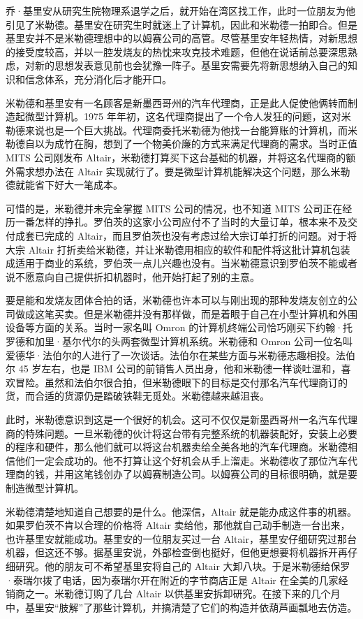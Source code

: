 \documentclass[12pt,UTF8]{ctexbook}
\begin{document}
乔·基里安从研究生院物理系退学之后，就开始在湾区找工作，此时一位朋友为他引见了米勒德。基里安在研究生时就迷上了计算机，因此和米勒德一拍即合。但是基里安并不是米勒德理想中的以姆赛公司的高管。尽管基里安年轻热情，对新思想的接受度较高，并以一腔发烧友的热忱来攻克技术难题，但他在说话前总要深思熟虑，对新的思想发表意见前也会犹豫一阵子。基里安需要先将新思想纳入自己的知识和信念体系，充分消化后才能开口。

米勒德和基里安有一名顾客是新墨西哥州的汽车代理商，正是此人促使他俩转而制造起微型计算机。1975 年年初，这名代理商提出了一个令人发狂的问题，这对米勒德来说也是一个巨大挑战。代理商委托米勒德为他找一台能算账的计算机，而米勒德自以为成竹在胸，想到了一个物美价廉的方式来满足代理商的需求。当时正值 MITS 公司刚发布 Altair，米勒德打算买下这台基础的机器，并将这名代理商的额外需求想办法在 Altair 实现就行了。要是微型计算机能解决这个问题，那么米勒德就能省下好大一笔成本。

可惜的是，米勒德并未完全掌握 MITS 公司的情况，也不知道 MITS 公司正在经历一番怎样的挣扎。罗伯茨的这家小公司应付不了当时的大量订单，根本来不及交付成套已完成的 Altair，而且罗伯茨也没有考虑过给大宗订单打折的问题。对于将大宗 Altair 打折卖给米勒德，并让米勒德用相应的软件和配件将这批计算机包装成适用于商业的系统，罗伯茨一点儿兴趣也没有。当米勒德意识到罗伯茨不能或者说不愿意向自己提供折扣机器时，他开始打起了别的主意。

要是能和发烧友团体合拍的话，米勒德也许本可以与刚出现的那种发烧友创立的公司做成这笔买卖。但是米勒德并没有那样做，而是着眼于自己在小型计算机和外围设备等方面的关系。当时一家名叫 Omron 的计算机终端公司恰巧刚买下约翰·托罗德和加里·基尔代尔的头两套微型计算机系统。米勒德和 Omron 公司一位名叫爱德华·法伯尔的人进行了一次谈话。法伯尔在某些方面与米勒德志趣相投。法伯尔 45 岁左右，也是 IBM 公司的前销售人员出身，他和米勒德一样谈吐温和，喜欢冒险。虽然和法伯尔很合拍，但米勒德眼下的目标是交付那名汽车代理商订的货，而合适的货源仍是踏破铁鞋无觅处。米勒德越来越沮丧。

此时，米勒德意识到这是一个很好的机会。这可不仅仅是新墨西哥州一名汽车代理商的特殊问题。一旦米勒德的伙计将这台带有完整系统的机器装配好，安装上必要的程序和硬件，那么他们就可以将这台机器卖给全美各地的汽车代理商。米勒德相信他们一定会成功的。他不打算让这个好机会从手上溜走。米勒德收了那位汽车代理商的钱，并用这笔钱创办了以姆赛制造公司。以姆赛公司的目标很明确，就是要制造微型计算机。

米勒德清楚地知道自己想要的是什么。他深信，Altair 就是能办成这件事的机器。如果罗伯茨不肯以合理的价格将 Altair 卖给他，那他就自己动手制造一台出来，也许基里安就能成功。基里安的一位朋友买过一台 Altair，基里安仔细研究过那台机器，但这还不够。据基里安说，外部检查倒也挺好，但他更想要将机器拆开再仔细研究。他的朋友可不希望基里安将自己的 Altair 大卸八块。于是米勒德给保罗·泰瑞尔拨了电话，因为泰瑞尔开在附近的字节商店正是 Altair 在全美的几家经销商之一。米勒德订购了几台 Altair 以供基里安拆卸研究。在接下来的几个月中，基里安“肢解”了那些计算机，并搞清楚了它们的构造并依葫芦画瓢地去仿造。
\end{document}
